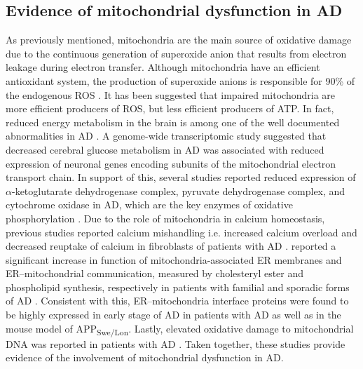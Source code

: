 \subsection{Evidence of mitochondrial dysfunction in AD}
As previously mentioned, mitochondria are the main source of oxidative damage due to the continuous generation of superoxide anion that results from electron leakage during electron transfer. Although mitochondria have an efficient antioxidant system, the production of superoxide anions is responsible for 90\% of the endogenous ROS \citep{Wang2014}. It has been suggested that impaired mitochondria are more efficient producers of ROS, but less efficient producers of ATP. In fact, reduced energy metabolism in the brain is among one of the well documented abnormalities in AD \citep{Wang2014}. A genome-wide transcriptomic study suggested that decreased cerebral glucose metabolism in AD was associated with reduced expression of neuronal genes encoding subunits of the mitochondrial electron transport chain. In support of this, several studies reported reduced expression of $\alpha$-ketoglutarate dehydrogenase complex, pyruvate dehydrogenase complex, and cytochrome oxidase in AD, which are the key enzymes of oxidative phosphorylation \citep{Chandrasekaran1994,Cottrell2001,Maurer2000}. Due to the role of mitochondria in calcium homeostasis, previous studies reported calcium mishandling i.e. increased calcium overload and decreased reuptake of calcium in fibroblasts of patients with AD \citep{Ito1994,Peterson1985}. \citet{Area-Gomez2012} reported a significant increase in function of mitochondria-associated ER membranes and ER–mitochondrial communication, measured by cholesteryl ester and phospholipid synthesis, respectively in patients with familial and sporadic forms of AD \citep{Area-Gomez2012}. Consistent with this, ER–mitochondria interface proteins were found to be highly expressed in early stage of AD in patients with AD as well as in the mouse model of APP\textsubscript{Swe/Lon}. Lastly, elevated oxidative damage to mitochondrial DNA was reported in patients with AD \citep{Mecocci1994,Wang2005}. Taken together, these studies provide evidence of the involvement of mitochondrial dysfunction in AD.

